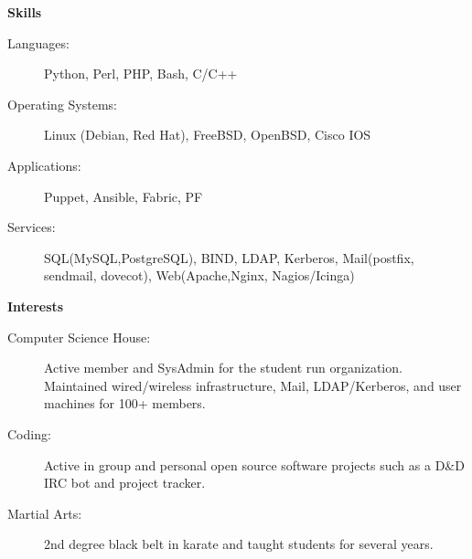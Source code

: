 \documentclass[letterpaper,11pt]{article}
\newcommand{\resheading}[1]{{\large \colorbox{mygrey}{\begin{minipage}{\textwidth}{\textbf{#1 \vphantom{p\^{E}}}}\end{minipage}}}}
\begin{document}
\resheading{Skills}

\begin{description}
\item[Languages:]
Python, Perl, PHP, Bash, C/C++
\item[Operating Systems:]
Linux (Debian, Red Hat), FreeBSD, OpenBSD, Cisco IOS
\item[Applications:]
Puppet, Ansible, Fabric, PF 
\item[Services:]
SQL(MySQL,PostgreSQL), BIND, LDAP, Kerberos, Mail(postfix, sendmail, dovecot), Web(Apache,Nginx, Nagios/Icinga)
\end{description}

\resheading{Interests}

\begin{description}
\item[Computer Science House:] Active member and SysAdmin for the student run organization. Maintained wired/wireless infrastructure, Mail, LDAP/Kerberos, and user machines for 100+ members. 
\item[Coding:] Active in group and personal open source software projects such as a D\&D IRC bot and project tracker. 
\item[Martial Arts:] 2nd degree black belt in karate and taught students for several years.

\end{description}
\end{document}

